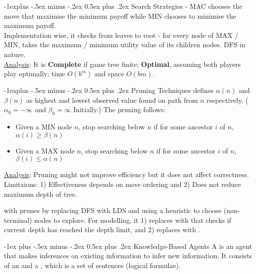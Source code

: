 \documentclass[10pt,landscape,letterpaper]{article}
\makeatletter
\renewcommand{\section}{\@startsection{section}{1}{0mm}%
                                {-1ex plus -.5ex minus -.2ex}%
                                {0.5ex plus .2ex}%
                                {\sffamily\large}}
\renewcommand{\subsection}{\@startsection{subsection}{2}{0mm}%
                                {-1explus -.5ex minus -.2ex}%
                                {0.5ex plus .2ex}%
                                {\sffamily\normalsize\itshape}}
\makeatother
\begin{document}
\begin{multicols}{3}
\subsection{Search Strategies}
 - MAC chooses the move that maximise the minimum payoff while MIN chooses to minimise the maximum payoff.
\\
Implementation wise, it checks from leaves to root - for every node of MAX / MIN, takes the maximum / minimum utility value of its children nodes. DFS in nature.
\\
\underline{Analysis}: It is \textbf{Complete} if game tree finite; \textbf{Optimal}, assuming both players play optimally; time $O(b^m)$ and space $O(bm)$.


\subsection{Pruning Techniques}
 defines $\alpha(n)$ and $\beta(n)$ as highest and lowest observed value found on path from $n$ respectively. ($\alpha_0 = -\infty$ and $\beta_0 = \infty$ Initially.) The pruning follows:
\begin{itemize}
    \item Given a MIN node $n$, stop searching below $n$ if for some ancestor $i$ of $n$, $\alpha(i) \ge \beta(n)$
    \item Given a MAX node $n$, stop searching below $n$ if for some ancestor $i$ of $n$, $\beta(i) \le \alpha(n)$
\end{itemize}
\underline{Analysis}: Pruning might not improve efficiency but it does not affect correctness. Limitaions: 1) Effectiveness depends on move ordering and 2) Does not reduce maximum depth of tree.

\smallskip

 with  prunes by replacing DFS with LDS and using a heuristic to choose (non-terminal) nodes to explore. For modelling, it 1) replaces  with  that checks if current depth has reached the depth limit, and 2) replaces  with .




\section{Knowledge-Based Agents}
A  is an agent that makes inferences on existing information to infer new information. It consists of an  and a , which is a set of sentences (logical formulae).


\end{multicols}
\end{document}
